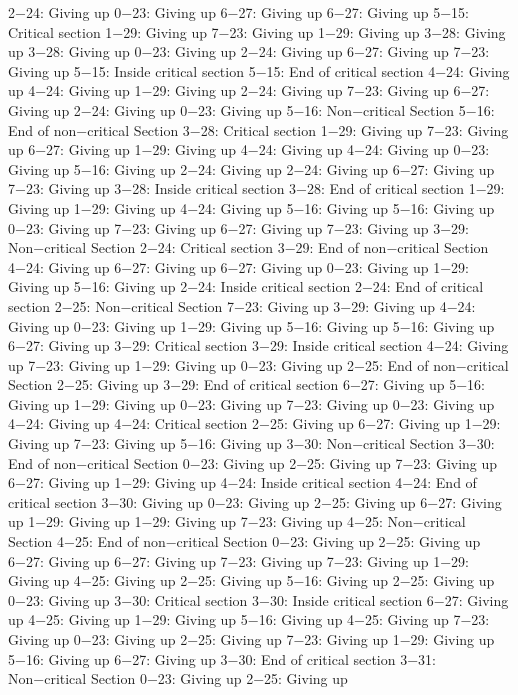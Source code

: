 2−24: Giving up
0−23: Giving up
6−27: Giving up
6−27: Giving up
5−15: Critical section
1−29: Giving up
7−23: Giving up
1−29: Giving up
3−28: Giving up
3−28: Giving up
0−23: Giving up
2−24: Giving up
6−27: Giving up
7−23: Giving up
5−15: Inside critical section
5−15: End of critical section
4−24: Giving up
4−24: Giving up
1−29: Giving up
2−24: Giving up
7−23: Giving up
6−27: Giving up
2−24: Giving up
0−23: Giving up
5−16: Non−critical Section
5−16: End of non−critical Section
3−28: Critical section
1−29: Giving up
7−23: Giving up
6−27: Giving up
1−29: Giving up
4−24: Giving up
4−24: Giving up
0−23: Giving up
5−16: Giving up
2−24: Giving up
2−24: Giving up
6−27: Giving up
7−23: Giving up
3−28: Inside critical section
3−28: End of critical section
1−29: Giving up
1−29: Giving up
4−24: Giving up
5−16: Giving up
5−16: Giving up
0−23: Giving up
7−23: Giving up
6−27: Giving up
7−23: Giving up
3−29: Non−critical Section
2−24: Critical section
3−29: End of non−critical Section
4−24: Giving up
6−27: Giving up
6−27: Giving up
0−23: Giving up
1−29: Giving up
5−16: Giving up
2−24: Inside critical section
2−24: End of critical section
2−25: Non−critical Section
7−23: Giving up
3−29: Giving up
4−24: Giving up
0−23: Giving up
1−29: Giving up
5−16: Giving up
5−16: Giving up
6−27: Giving up
3−29: Critical section
3−29: Inside critical section
4−24: Giving up
7−23: Giving up
1−29: Giving up
0−23: Giving up
2−25: End of non−critical Section
2−25: Giving up
3−29: End of critical section
6−27: Giving up
5−16: Giving up
1−29: Giving up
0−23: Giving up
7−23: Giving up
0−23: Giving up
4−24: Giving up
4−24: Critical section
2−25: Giving up
6−27: Giving up
1−29: Giving up
7−23: Giving up
5−16: Giving up
3−30: Non−critical Section
3−30: End of non−critical Section
0−23: Giving up
2−25: Giving up
7−23: Giving up
6−27: Giving up
1−29: Giving up
4−24: Inside critical section
4−24: End of critical section
3−30: Giving up
0−23: Giving up
2−25: Giving up
6−27: Giving up
1−29: Giving up
1−29: Giving up
7−23: Giving up
4−25: Non−critical Section
4−25: End of non−critical Section
0−23: Giving up
2−25: Giving up
6−27: Giving up
6−27: Giving up
7−23: Giving up
7−23: Giving up
1−29: Giving up
4−25: Giving up
2−25: Giving up
5−16: Giving up
2−25: Giving up
0−23: Giving up
3−30: Critical section
3−30: Inside critical section
6−27: Giving up
4−25: Giving up
1−29: Giving up
5−16: Giving up
4−25: Giving up
7−23: Giving up
0−23: Giving up
2−25: Giving up
7−23: Giving up
1−29: Giving up
5−16: Giving up
6−27: Giving up
3−30: End of critical section
3−31: Non−critical Section
0−23: Giving up
2−25: Giving up
